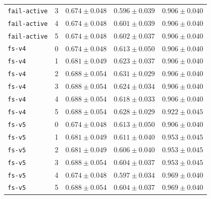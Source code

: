 \documentclass{article}
\begin{document}
\begin{center}
\begin{tabular}{llccc}
\texttt{fail-active} & 3 & $0.674 \pm 0.048$ & $0.596 \pm 0.039$ & $0.906 \pm 0.040$ \\
\texttt{fail-active} & 4 & $0.674 \pm 0.048$ & $0.601 \pm 0.039$ & $0.906 \pm 0.040$ \\
\texttt{fail-active} & 5 & $0.674 \pm 0.048$ & $0.602 \pm 0.037$ & $0.906 \pm 0.040$ \\
\texttt{fs-v4} & 0 & $0.674 \pm 0.048$ & $0.613 \pm 0.050$ & $0.906 \pm 0.040$ \\
\texttt{fs-v4} & 1 & $0.681 \pm 0.049$ & $0.623 \pm 0.037$ & $0.906 \pm 0.040$ \\
\texttt{fs-v4} & 2 & $0.688 \pm 0.054$ & $0.631 \pm 0.029$ & $0.906 \pm 0.040$ \\
\texttt{fs-v4} & 3 & $0.688 \pm 0.054$ & $0.624 \pm 0.034$ & $0.906 \pm 0.040$ \\
\texttt{fs-v4} & 4 & $0.688 \pm 0.054$ & $0.618 \pm 0.033$ & $0.906 \pm 0.040$ \\
\texttt{fs-v4} & 5 & $0.688 \pm 0.054$ & $0.628 \pm 0.029$ & $0.922 \pm 0.045$ \\
\texttt{fs-v5} & 0 & $0.674 \pm 0.048$ & $0.613 \pm 0.050$ & $0.906 \pm 0.040$ \\
\texttt{fs-v5} & 1 & $0.681 \pm 0.049$ & $0.611 \pm 0.040$ & $0.953 \pm 0.045$ \\
\texttt{fs-v5} & 2 & $0.681 \pm 0.049$ & $0.606 \pm 0.040$ & $0.953 \pm 0.045$ \\
\texttt{fs-v5} & 3 & $0.688 \pm 0.054$ & $0.604 \pm 0.037$ & $0.953 \pm 0.045$ \\
\texttt{fs-v5} & 4 & $0.674 \pm 0.048$ & $0.597 \pm 0.034$ & $0.969 \pm 0.040$ \\
\texttt{fs-v5} & 5 & $0.688 \pm 0.054$ & $0.604 \pm 0.037$ & $0.969 \pm 0.040$ \\
\bottomrule
\end{tabular}
\end{center}
\end{document}
